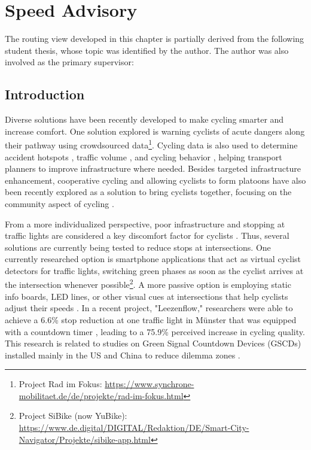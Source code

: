 \chapter{Speed Advisory}\label{ch:app}

\begin{Summary}
The routing view developed in this chapter is partially derived from the following student thesis, whose topic was identified by the author. The author was also involved as the primary supervisor:

\cite{pickhardt_2022} 
\end{Summary}

\section{Introduction}

Diverse solutions have been recently developed to make cycling smarter and increase comfort. One solution explored is warning cyclists of acute dangers along their pathway using crowdsourced data\footnote{Project Rad im Fokus: \url{https://www.synchrone-mobilitaet.de/de/projekte/rad-im-fokus.html}}. Cycling data is also used to determine accident hotspots \cite{von_stulpnagel_crash_2022}, traffic volume \cite{lissner_modeling_2018}, and cycling behavior \cite{lisner_gps-data_2020}, helping transport planners to improve infrastructure where needed. Besides targeted infrastructure enhancement, cooperative cycling and allowing cyclists to form platoons have also been recently explored as a solution to bring cyclists together, focusing on the community aspect of cycling \cite{cespedes_group_2019, meng_connected_2022}.

From a more individualized perspective, poor infrastructure and stopping at traffic lights are considered a key discomfort factor for cyclists \cite{otto_framework_2023}. Thus, several solutions are currently being tested to reduce stops at intersections. One currently researched option is smartphone applications that act as virtual cyclist detectors for traffic lights, switching green phases as soon as the cyclist arrives at the intersection whenever possible\footnote{Project SiBike (now YuBike): \url{https://www.de.digital/DIGITAL/Redaktion/DE/Smart-City-Navigator/Projekte/sibike-app.html}}. A more passive option is employing static info boards, LED lines, or other visual cues at intersections that help cyclists adjust their speeds \cite{de_angelis_green_2019}. In a recent project, "Leezenflow," researchers were able to achieve a 6.6\% stop reduction at one traffic light in Münster that was equipped with a countdown timer \cite{brand_riding_2024}, leading to a 75.9\% perceived increase in cycling quality. This research is related to studies on Green Signal Countdown Devices (GSCDs) installed mainly in the US and China to reduce dilemma zones \cite{lum_before-and-after_2006, huang_evaluating_2014, ni_estimating_2014, chen_exploring_2015, islam_improved_2016}. 

